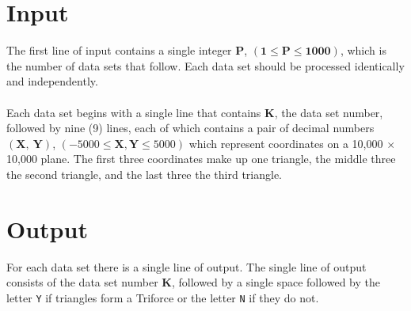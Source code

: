 \documentclass[11pt]{article}
\begin{document}
\section{Input}
The first line of input contains a single integer $\boldsymbol{P}$,
$(\boldsymbol{1} \le \boldsymbol{P} \le \boldsymbol{1000})$, which is the
number of data sets that follow. Each data set should be processed identically
and independently.
\\\\
Each data set begins with a single line that contains $\boldsymbol{K}$, the data
set number, followed by nine (9) lines, each of which contains a pair of decimal numbers
$(\boldsymbol{X},\ \boldsymbol{Y})$, $(-5000 \le \boldsymbol{X},\boldsymbol{Y} \le 5000)$
which represent coordinates on a 10,000 $\times$ 10,000 plane. The first three
coordinates make up one triangle, the middle three the second triangle, and
the last three the third triangle.

\section{Output}
For each data set there is a single line of output. The single line of output
consists of the data set number $\boldsymbol{K}$, followed by a single space
followed by the letter \texttt{Y} if triangles form a Triforce or the letter
\texttt{N} if they do not.
\end{document}
